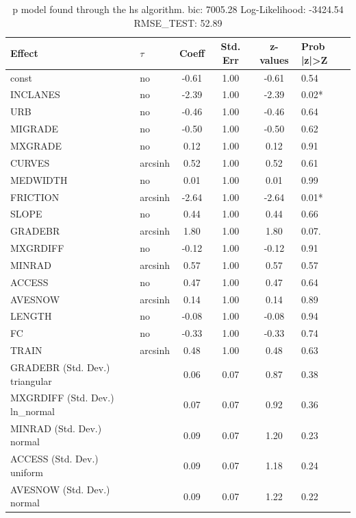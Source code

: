 \begin{table}
	\caption{p model found through the hs algorithm. bic: 7005.28 Log-Likelihood: -3424.54 RMSE_TEST: 52.89}
	\begin{center}
		\begin{tabular}{|l|l|c|c|c|l|}
			\hline
			Effect & $\tau$ & Coeff & Std. Err & z-values & Prob |z|>Z \\
			\hline
			const & no & -0.61 & 1.00 & -0.61 & 0.54 \\
			\hline
			INCLANES & no & -2.39 & 1.00 & -2.39 & 0.02* \\
			\hline
			URB & no & -0.46 & 1.00 & -0.46 & 0.64 \\
			\hline
			MIGRADE & no & -0.50 & 1.00 & -0.50 & 0.62 \\
			\hline
			MXGRADE & no & 0.12 & 1.00 & 0.12 & 0.91 \\
			\hline
			CURVES & arcsinh & 0.52 & 1.00 & 0.52 & 0.61 \\
			\hline
			MEDWIDTH & no & 0.01 & 1.00 & 0.01 & 0.99 \\
			\hline
			FRICTION & arcsinh & -2.64 & 1.00 & -2.64 & 0.01* \\
			\hline
			SLOPE & no & 0.44 & 1.00 & 0.44 & 0.66 \\
			\hline
			GRADEBR & arcsinh & 1.80 & 1.00 & 1.80 & 0.07. \\
			\hline
			MXGRDIFF & no & -0.12 & 1.00 & -0.12 & 0.91 \\
			\hline
			MINRAD & arcsinh & 0.57 & 1.00 & 0.57 & 0.57 \\
			\hline
			ACCESS & no & 0.47 & 1.00 & 0.47 & 0.64 \\
			\hline
			AVESNOW & arcsinh & 0.14 & 1.00 & 0.14 & 0.89 \\
			\hline
			LENGTH & no & -0.08 & 1.00 & -0.08 & 0.94 \\
			\hline
			FC & no & -0.33 & 1.00 & -0.33 & 0.74 \\
			\hline
			TRAIN & arcsinh & 0.48 & 1.00 & 0.48 & 0.63 \\
			\hline
			GRADEBR (Std. Dev.) triangular &  & 0.06 & 0.07 & 0.87 & 0.38 \\
			\hline
			MXGRDIFF (Std. Dev.) ln_normal &  & 0.07 & 0.07 & 0.92 & 0.36 \\
			\hline
			MINRAD (Std. Dev.) normal &  & 0.09 & 0.07 & 1.20 & 0.23 \\
			\hline
			ACCESS (Std. Dev.) uniform &  & 0.09 & 0.07 & 1.18 & 0.24 \\
			\hline
			AVESNOW (Std. Dev.) normal &  & 0.09 & 0.07 & 1.22 & 0.22 \\

\end{tabular}
\end{center}
\end{table}
